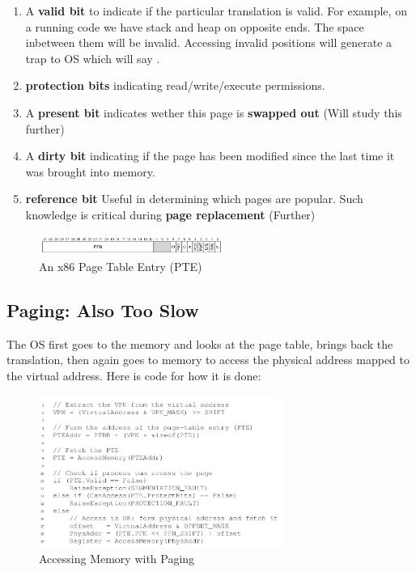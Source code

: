 \begin{enumerate}
    \item A \textbf{valid bit} to indicate if the particular translation is
        valid. For example, on a running code we have stack and heap on 
        opposite ends. The space inbetween them will be invalid. Accessing 
        invalid positions will generate a trap to OS which will say
        .
    \item \textbf{protection bits} indicating read/write/execute permissions.
    \item A \textbf{present bit} indicates wether this page is \textbf{swapped
        out} (Will study this further)
    \item A \textbf{dirty bit} indicating if the page has been modified since
        the last time it was brought into memory.
    \item \textbf{reference bit} Useful in determining which pages are popular.
        Such knowledge is critical during \textbf{page replacement} (Further)
\end{enumerate}

\begin{figure}[h!]
    \begin{center}
        \includegraphics[width=6cm]{img/185.png}
        \caption{An x86 Page Table Entry (PTE)}
    \end{center}
\end{figure}

\subsection{Paging: Also Too Slow} 

The OS first goes to the memory and looks at the page table, brings back the 
translation, then again goes to memory to access the physical address mapped
to the virtual address. Here is code for how it is done:

\begin{figure}[h!]
    \begin{center}
        \includegraphics[width=8cm]{img/186.png}
        \caption{Accessing Memory with Paging}
    \end{center}
\end{figure}

